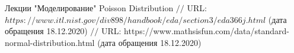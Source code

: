 \makeatletter \renewcommand{} \makeatother
\renewcommand\refname{Список использованных источников}
\begin{thebibliography}{00}
	
	Лекции "Моделирование"
	Poisson Distribution $//$ URL: $https://www.itl.nist.gov/div898/handbook/eda/section3/eda366j.html$ (дата обращения 18.12.2020)
	 $//$ URL: https://www.mathsisfun.com/data/standard-normal-distribution.html (дата обращения 18.12.2020)
\end{thebibliography}
